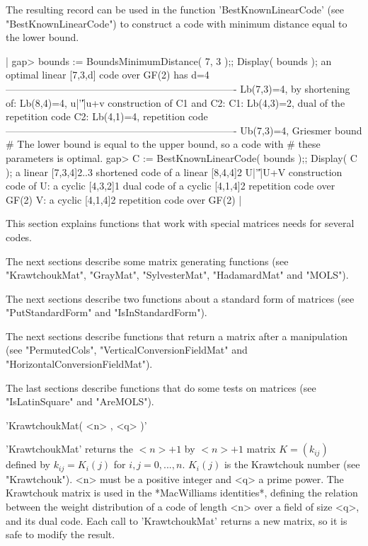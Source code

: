 The  resulting record can  be  used in the function 'BestKnownLinearCode'
(see "BestKnownLinearCode") to   construct a code  with minimum  distance
equal to the lower bound.

|    gap> bounds := BoundsMinimumDistance( 7, 3 );; Display( bounds );
    an optimal linear [7,3,d] code over GF(2) has d=4
    ----------------------------------------------------------------------
    Lb(7,3)=4, by shortening of:
    Lb(8,4)=4, u|'\|'|u+v construction of C1 and C2:
    C1: Lb(4,3)=2, dual of the repetition code
    C2: Lb(4,1)=4, repetition code
    ----------------------------------------------------------------------
    Ub(7,3)=4, Griesmer bound
    # The lower bound is equal to the upper bound, so a code with
    # these parameters is optimal.
    gap> C := BestKnownLinearCode( bounds );; Display( C );
    a linear [7,3,4]2..3 shortened code of
    a linear [8,4,4]2 U|'\|'|U+V construction code of
    U: a cyclic [4,3,2]1 dual code of
       a cyclic [4,1,4]2 repetition code over GF(2)
    V: a cyclic [4,1,4]2 repetition code over GF(2) |


This section explains functions  that work with special matrices {\GUAVA}
needs for several codes.

The next  sections   describe  some  matrix  generating  functions   (see
"KrawtchoukMat", "GrayMat", "SylvesterMat", "HadamardMat" and "MOLS").

The next   sections  describe two  functions  about   a standard  form of
matrices (see "PutStandardForm" and "IsInStandardForm").

The next sections  describe  functions  that  return  a matrix  after   a
manipulation (see "PermutedCols",     "VerticalConversionFieldMat"    and
"HorizontalConversionFieldMat").

The last sections describe functions that  do some tests on matrices (see
"IsLatinSquare" and "AreMOLS").


'KrawtchoukMat( <n> , <q> )'

'KrawtchoukMat' returns  the   $<n>+1$  by $<n>+1$   matrix  $K=(k_{ij})$
defined by $k_{ij}=K_i(j)$ for $i,j=0,...,n$.  $K_i(j)$ is the Krawtchouk
number (see "Krawtchouk"). <n> must be a positive integer and <q> a prime
power.  The Krawtchouk  matrix is used  in  the *MacWilliams identities*,
defining the relation between the weight distribution of a code of length
<n>  over  a  field  of  size <q>,  and  its  dual code.    Each call  to
'KrawtchoukMat' returns a new matrix, so it is safe to modify the result.

